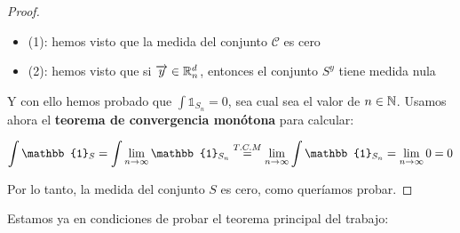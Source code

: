 \begin{proof}
    \begin{itemize}
        \item (1): hemos visto que la medida del conjunto $\mathcal{C}$ es cero
        \item (2): hemos visto que si $\overrightarrow{y} \in \mathbb{R}_n^d$, entonces el conjunto $S^{y}$ tiene medida nula
    \end{itemize}

    Y con ello hemos probado que $\int \mathbb{1}_{S_n} = 0$, sea cual sea el valor de $n \in \mathbb{N}$. Usamos ahora el \textbf{teorema de convergencia monótona} para calcular:

    \begin{equation}
        \int \mathbb{1}_S = \int \lim_{n \to \infty} \mathbb{1}_{S_n} \encima{=}{T.C.M} \lim_{n \to \infty} \int \mathbb{1}_{S_n} = \lim_{n \to \infty} 0  = 0
    \end{equation}

    Por lo tanto, la medida del conjunto $S$ es cero, como queríamos probar.

\end{proof}

Estamos ya en condiciones de probar el teorema principal del trabajo:

